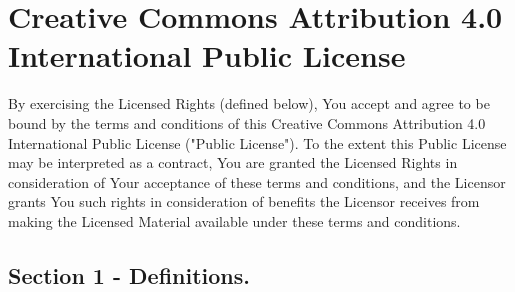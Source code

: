 \section{Creative Commons Attribution 4.0 International Public License}
By exercising the Licensed Rights (defined below), You accept and agree to be bound by the terms and conditions of this Creative Commons Attribution 4.0 International Public License ("Public License"). To the extent this Public License may be interpreted as a contract, You are granted the Licensed Rights in consideration of Your acceptance of these terms and conditions, and the Licensor grants You such rights in consideration of benefits the Licensor receives from making the Licensed Material available under these terms and conditions.

\subsection{Section 1 - Definitions.}
